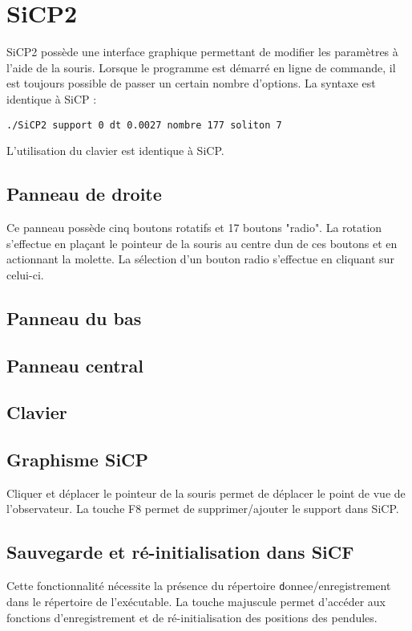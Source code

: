 %
\section{SiCP2}
%
%
SiCP2 possède une interface graphique permettant de modifier les paramètres à l'aide de la souris. Lorsque le programme est démarré en ligne de commande, il est toujours possible de passer un certain nombre d'options. La syntaxe est identique à SiCP :
\begin{center}
\texttt{./SiCP2 support 0 dt 0.0027 nombre 177 soliton 7}
\end{center}
L'utilisation du clavier est identique à SiCP.
%
%
%
\subsection{Panneau de droite}
%
Ce panneau possède cinq boutons rotatifs et 17 boutons "radio". La rotation s'effectue en plaçant le pointeur de la souris au centre dun de ces boutons et en actionnant la molette. La sélection d'un bouton radio s'effectue en cliquant sur celui-ci. 
%
%
%
\subsection{Panneau du bas}
%
%
%

%
%
%
\subsection{Panneau central}
%
%
%
%
\subsection{Clavier}
%
\footnotesize
\normalsize
%
\subsection{Graphisme SiCP}
Cliquer et déplacer le pointeur de la souris permet de déplacer le point de vue de l'observateur. La touche {\sf F8} permet de supprimer/ajouter le support dans SiCP.
%
\subsection{Sauvegarde et ré-initialisation dans SiCF}
%
Cette fonctionnalité nécessite la présence du répertoire {\texttt donnee/enregistrement} dans le répertoire de l'exécutable.
La touche majuscule permet d'accéder aux fonctions d'enregistrement et de ré-initialisation des positions des pendules.

